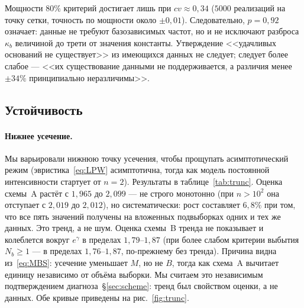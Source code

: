 \documentclass[11pt,a4paper]{article}
\theoremstyle{plain}
\theoremstyle{remark}
\newcommand{\eg}{e^{\gamma}}
\begin{document}
Мощности $80\%$ критерий достигает лишь при $cv\approx0{,}34$ ($5000$ реализаций
на точку сетки, точность по мощности около $\pm0{,}01$). Следовательно,
$p=0{,}92$ означает: данные не требуют базозависимых частот, но и не исключают
разброса $\kappa_b$ величиной до трети от значения константы. Утверждение
<<удачливых оснований не существует>> из имеющихся данных не следует; следует более
слабое --- <<их существование данными не поддерживается, а различия менее $\pm34\%$
принципиально неразличимы>>.

\subsection{Устойчивость}\label{sec:robust}

\paragraph{Нижнее усечение.} Мы варьировали нижнюю точку усечения, чтобы прощупать
асимптотический режим (эвристика~\eqref{eq:LPW} асимптотична, тогда как модель
постоянной интенсивности стартует от $n=2$). Результаты в таблице~\ref{tab:trunc}.
Оценка схемы~A растёт с $1{,}965$ до $2{,}099$ --- не строго монотонно (при
$n>10^{2}$ она отступает с $2{,}019$ до $2{,}012$), но систематически: рост
составляет $6{,}8\%$ при том, что все пять значений получены на вложенных
подвыборках одних и тех же данных. Это тренд, а не шум. Оценка схемы~B тренда не показывает и колеблется вокруг $\eg$
в пределах $1{,}79$--$1{,}87$ (при более слабом критерии выбытия $N_b\ge1$ ---
в пределах $1{,}76$--$1{,}87$, по-прежнему без тренда). Причина видна
из~\eqref{eq:MBS}: усечение уменьшает $M$, но не $B$, тогда как схема~A вычитает
единицу независимо от объёма выборки. Мы считаем это независимым подтверждением
диагноза~\S\ref{sec:scheme}: тренд был свойством оценки, а не данных.
Обе кривые приведены на рис.~\ref{fig:trunc}.
\end{document}
